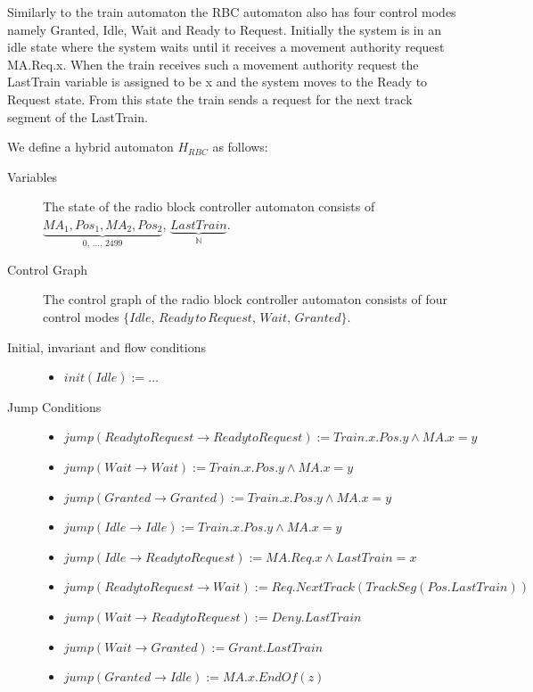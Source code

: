 \medskip
Similarly to the train automaton the RBC automaton also has four control modes namely Granted, Idle, Wait and Ready to Request. Initially the system is in an idle state where the system waits until it receives a movement authority request MA.Req.x. When the train receives such a movement authority request the LastTrain variable is assigned to be x and the system moves to the Ready to Request state.  From this state the train sends a request for the next track segment of the LastTrain.
\medskip

\begin{mydef}

We define a hybrid automaton $H_{RBC}$ as follows:
\begin{description}
\item[Variables] The state of the radio block controller automaton consists of $\underbrace{MA_1, Pos_1, MA_2, Pos_2}_\text{0, \ldots , 2499}$, \newline $\underbrace{LastTrain}_{\mathbb{N}}$.

\item[Control Graph] The control graph of the radio block controller automaton consists of four control modes $\{Idle, \, Ready \, to \, Request, \, Wait, \, Granted \}$.

\item[Initial, invariant and flow conditions] \hspace*{0mm}
	\begin{itemize}
	\item $init(Idle) :=   \ldots $

	\end{itemize}

\item[Jump Conditions] \hspace*{0mm}

	\begin{itemize}
	\item $jump(Ready to Request \to Ready to Request) := Train.x.Pos.y \wedge MA.x = y$
	\item $jump(Wait \to Wait) := Train.x.Pos.y \wedge MA.x = y$
	\item $jump(Granted \to Granted) := Train.x.Pos.y \wedge MA.x = y$
	\item $jump(Idle \to Idle) := Train.x.Pos.y \wedge MA.x = y$
	\item $jump(Idle \to Ready to Request) := MA.Req.x \wedge LastTrain = x$
	\item $jump(Ready to Request \to Wait) := Req.NextTrack(TrackSeg(Pos.LastTrain))$
	\item $jump(Wait \to Ready to Request) := Deny.LastTrain$
	\item $jump(Wait \to Granted) := Grant.LastTrain$
	\item $jump(Granted \to Idle) := MA.x.EndOf(z)$




\end{itemize}
\end{description}
\end{mydef}
